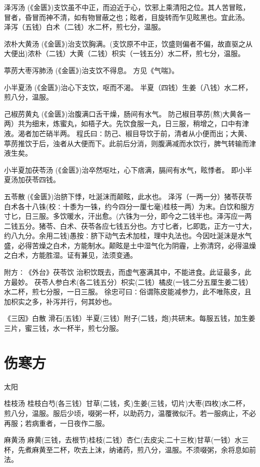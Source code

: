 \documentclass[a4paper,12pt,UTF8,twoside]{ctexbook}
\begin{document}
	泽泻汤
	(《金匮》)支饮虽不中正，而迫近于心，饮邪上乘清阳之位。其人苦冒眩，冒者，昏冒而神不清，如有物冒蔽之也；眩者，目旋转而乍见眩黑也。宜此汤。
	泽泻（五钱）白术（二钱）水二杯，煎七分，温服。
	
	浓朴大黄汤
	(《金匮》)治支饮胸满。(支饮原不中正，饮盛则偏者不偏，故直驱之从大便出)浓朴（二钱）大黄（二钱）枳实（一钱五分）水二杯，煎七分，温服。
	
	葶苈大枣泻肺汤
	(《金匮》)治支饮不得息。
	方见《气喘》。
	
	小半夏汤
	(《金匮》)治心下支饮，呕而不渴。
	半夏（四钱）生姜（八钱）水二杯，煎八分，温服。
	
	己椒苈黄丸
	(《金匮》)治腹满口舌干燥，肠间有水气。
	防己椒目葶苈(熬)大黄各一两）共为细末，炼蜜丸，如梧子大。先饮食服一丸，日三服，稍增之，口中有津液。渴者加芒硝半两。
	程氏曰∶防己、椒目导饮于前，清者从小便而出；大黄、葶苈推饮于后，浊者从大便而下。此前后分消，则腹满减而水饮行，脾气转输而津液生矣。
	
	小半夏加茯苓汤
	(《金匮》)治卒然呕吐，心下痞满，膈间有水气，眩悸者。
	即小半夏汤加茯苓四钱。
	
	五苓散
	(《金匮》)治脐下悸，吐涎沫而颠眩，此水也。
	泽泻（一两一分）猪苓茯苓白术各十八铢(校∶十黍为一铢，约今四分一厘七毫)桂枝一两）为末。白饮和服方寸匕，日三服。多饮暖水，汗出愈。(六铢为一分，即今之二钱半也。泽泻应一两二钱五分。猪苓、白术、茯苓各应七钱五分也。方寸匕者，匕即匙，正方一寸大，约八九分。余用二钱)愚按∶脐下动气去术加桂，理中丸法也。今因吐涎沫是水气盛，必得苦燥之白术，方能制水。颠眩是土中湿气化为阴霾，上弥清窍，必得温燥之白术，方能胜湿。证有兼见，法须变通。
	
	附方∶《外台》茯苓饮
	治积饮既去，而虚气塞满其中，不能进食。此证最多，此方最妙。
	茯苓人参白术(各二钱五分）枳实(二钱）橘皮(一钱二分五厘生姜二钱）水二杯，煎七分服，一日三服。
	徐忠可曰∶俗谓陈皮能减参力，此不唯陈皮，且加枳实之多，补泻并行，何其妙也。
	
	《三因》白散
	滑石(五钱）半夏(三钱）附子(二钱，炮)共研末。每服五钱，加生姜三片，蜜三钱，水一杯半，煎七分服。
	
	\chapter{伤寒方}
	太阳	
	
	桂枝汤
	桂枝白芍(各三钱）甘草(二钱，炙)生姜(三钱，切片)大枣(四枚)水二杯，煎八分，温服。服后少顷，啜粥一杯，以助药力，温覆微似汗。若一服病止，不必再服；若病重者，一日夜作二服。
	
	麻黄汤
	麻黄(三钱，去根节)桂枝(二钱）杏仁(去皮尖,二十三枚)甘草(一钱）水三杯，先煮麻黄至二杯，吹去上沫，纳诸药，煎八分，温服。不须啜粥，余将息如前法。
	
\end{document}
